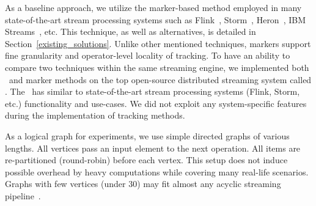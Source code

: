 As a baseline approach, we utilize the marker-based method employed in many state-of-the-art stream processing systems such as Flink~\cite{Carbone:2017:SMA:3137765.3137777}, Storm~\cite{apache:storm:state}, Heron~\cite{Kulkarni:2015:THS:2723372.2742788}, IBM Streams~\cite{jacques2016consistent}, etc. This technique, as well as alternatives, is detailed in Section~\ref{existing_solutions}. 
Unlike other mentioned techniques, markers support fine granularity and operator-level locality of tracking. 
To have an ability to compare two techniques within the same streaming engine, we implemented both \tracker\ and marker methods on the top open-source distributed streaming system called \FlameStream. The  \FlameStream\ has similar to state-of-the-art stream processing systems (Flink, Storm, etc.) functionality and use-cases. 
We did not exploit any system-specific features during the implementation of tracking methods.

As a logical graph for experiments, we use simple directed graphs of various lengths. All vertices pass an input element to the next operation. All items are re-partitioned (round-robin) before each vertex. This setup does not induce possible overhead by heavy computations while covering many real-life scenarios. Graphs with few vertices (under 30) may fit almost any acyclic streaming pipeline~\cite{akidau2018streaming}. 

